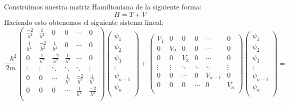 \documentclass{article}
\begin{document}
Construimos nuestra matriz Hamiltoniana de la siguiente forma:
\begin{equation}
	H=T+V
\end{equation}
Haciendo esto obtenemos el siguiente sistema lineal: \\

\begin{equation*}
	\frac{-\hbar^2}{2m} \left(
	\begin{matrix}
  \frac{-2}{h^2} & \frac{1}{h^2} & 0 & 0 &  \cdots & 0 \\
  \frac{1}{h^2} &  \frac{-2}{h^2} & \frac{1}{h^2} & 0 & \cdots & 0\\
  0 & \frac{1}{h^2} &  \frac{-2}{h^2} & \frac{1}{h^2} & \cdots & 0\\
  \vdots & \vdots&\ddots &\ddots &\ddots& \vdots \\
  0 & 0   &\cdots &\frac{1}{h^2}&  \frac{-2}{h^2} & \frac{1}{h^2} \\
  0 & 0 & 0  &\cdots & \frac{1}{h^2} &  \frac{-2}{h^2} \\
	\end{matrix}
	\right)
	\left(
	\begin{matrix}
		\psi_1 \\
		\psi_2 \\
		\psi_3 \\
		\vdots\\
		\psi_{n-1} \\
		\psi_{n} \\
	\end{matrix}
	\right)
		+
	\left(
	\begin{matrix}
		V_1 & 0 & 0 & 0 &  \cdots & 0 \\
		0 & V_2 & 0 & 0 & \cdots & 0\\
		0 & 0 & V_3 & 0 & \cdots & 0\\
		\vdots & \vdots&\ddots &\ddots &\ddots& \vdots \\
		0 & 0   &\cdots &0& V_{n-1} & 0 \\
		0 & 0 & 0  &\cdots & 0 & V_{n} \\
	\end{matrix}
	\right)
	\left(
	\begin{matrix}
		\psi_1 \\
		\psi_2 \\
		\psi_3 \\
		\vdots\\
		\psi_{n-1} \\
		\psi_{n} \\
	\end{matrix}
	\right)	
	=
\end{equation*}
\end{document}
